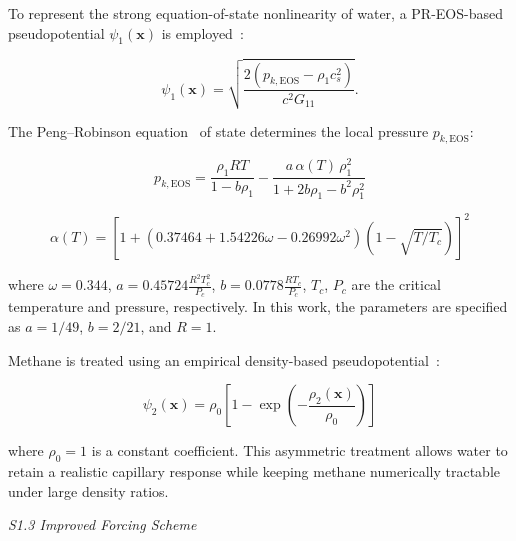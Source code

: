 \documentclass[draft,wrr]{agutexSI2019}
\begin{document}
\begin{article}
To represent the strong equation-of-state nonlinearity of water, a
PR-EOS-based pseudopotential $\psi_1(\mathbf{x})$ is employed~\cite{he_thermodynamic_xxxx,yuan_equations_2006}:
\begin{linenomath*}
\begin{equation}
\label{eq:psi_water}
\psi_1(\mathbf{x})
=
\sqrt{
\frac{
2\left(
p_{k,\mathrm{EOS}}
-
\rho_1 c_s^2
\right)
}{
c^2 G_{11}
}
} .
\end{equation}
\end{linenomath*}
The Peng--Robinson equation~\cite{yuan_equations_2006} of state determines the local pressure $p_{k,\mathrm{EOS}}$:
\begin{linenomath*}
\begin{equation}
\label{eq:pr_eos}
p_{k,\mathrm{EOS}}
=
\frac{\rho_1 R T}{1 - b\rho_1}
-
\frac{a\,\alpha(T)\,\rho_1^2}{1 + 2b\rho_1 - b^2\rho_1^2}
\end{equation}
\end{linenomath*}

\begin{linenomath*}
\begin{equation}
\label{eq:phi-T}
\alpha(T) = \left[ 1 + (0.37464 + 1.54226\omega - 0.26992\omega^2) (1 - \sqrt{T/T_c}) \right]^2
\end{equation}
\end{linenomath*}
where $\omega = 0.344$, $a = 0.45724 \frac{R^2 T_c^2}{P_c}$, $b = 0.0778 \frac{R T_c}{P_c}$, $T_c$, $P_c$ are the
critical temperature and pressure, respectively.
In this work, the parameters are specified as $a = 1/49$, $b = 2/21$, and $R = 1$.

Methane is treated using an empirical density-based pseudopotential~\cite{xin_effect_2021}:
\begin{linenomath*}
\begin{equation}
\label{eq:psi_methane}
\psi_2(\mathbf{x})
=
\rho_0
\left[
1
-
\exp
\left(
-
\frac{\rho_2(\mathbf{x})}{\rho_0}
\right)
\right]
\end{equation}
\end{linenomath*}
where $\rho_0 = 1$ is a constant coefficient. This asymmetric treatment allows
water to retain a realistic capillary response while keeping methane numerically
tractable under large density ratios.

\noindent\textit{S1.3 Improved Forcing Scheme}


\end{article}
\end{document}
